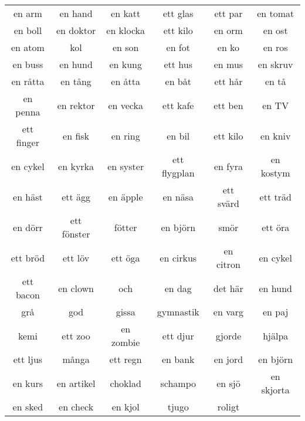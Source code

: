 \begin{center}
    \begin{tabular}{|c c c c c c|}
        \hline
        en arm & en hand & en katt & ett glas & ett par & en tomat \\
        en boll & en doktor & en klocka & ett kilo & en orm & en ost \\
        en atom & kol & en son & en fot & en ko & en ros \\
        en buss & en hund & en kung & ett hus & en mus & en skruv \\
        en råtta & en tång & en åtta & en båt & ett hår & en tå \\
        en penna & en rektor & en vecka & ett kafe & ett ben & en TV \\
        ett finger & en fisk & en ring & en bil & ett kilo &  en kniv \\
        en cykel  & en kyrka & en syster & ett flygplan & en fyra & en kostym \\
        en häst & ett ägg & en äpple & en näsa & ett svärd & ett träd \\
        en dörr & ett fönster & fötter & en björn & smör & ett öra \\
        ett bröd & ett löv & ett öga & en cirkus & en citron & en cykel \\
        ett bacon & en clown & och & en dag & det här & en hund \\
        grå & god & gissa & gymnastik & en varg & en paj \\
        kemi & ett zoo & en zombie & ett djur & gjorde  & hjälpa \\
        ett ljus & många & ett regn & en bank & en jord & en björn \\
        en kurs & en artikel & choklad & schampo & en sjö & en skjorta \\
        en sked & en check & en kjol & tjugo & roligt & \\
        \hline
    \end{tabular}
\end{center}

